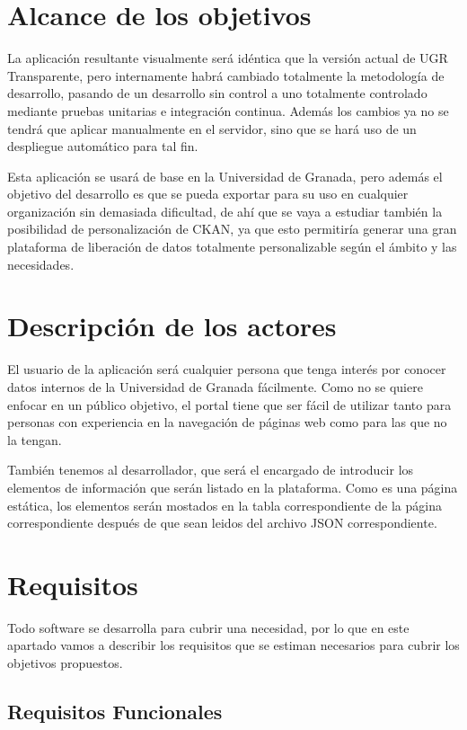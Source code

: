 \section{Alcance de los objetivos}

La aplicación resultante visualmente será idéntica que la versión actual de UGR Transparente, pero internamente habrá cambiado
totalmente la metodología de desarrollo, pasando de un desarrollo sin control a uno totalmente controlado mediante pruebas 
unitarias e integración continua. Además los cambios ya no se tendrá que aplicar manualmente en el servidor, sino que se hará
uso de un despliegue automático para tal fin.

\bigskip
Esta aplicación se usará de base en la Universidad de Granada, pero además el objetivo del desarrollo es que se pueda exportar 
para su uso en cualquier organización sin demasiada dificultad, de ahí que se vaya a estudiar también la posibilidad de 
personalización de CKAN, ya que esto permitiría generar una gran plataforma de liberación de datos totalmente personalizable
según el ámbito y las necesidades.

\section{Descripción de los actores}

El usuario de la aplicación será cualquier persona que tenga interés por conocer datos internos de la Universidad de Granada 
fácilmente. Como no se quiere enfocar en un público objetivo, el portal tiene que ser fácil de utilizar tanto para personas 
con experiencia en la navegación de páginas web como para las que no la tengan.

\bigskip
También tenemos al desarrollador, que será el encargado de introducir los elementos de información que serán listado en la
plataforma. Como es una página estática, los elementos serán mostados en la tabla correspondiente de la página correspondiente
después de que sean leidos del archivo JSON correspondiente.

\newpage
\section{Requisitos}

Todo software se desarrolla para cubrir una necesidad, por lo que en este apartado vamos a describir los requisitos que se 
estiman necesarios para cubrir los objetivos propuestos.

\subsection{Requisitos Funcionales}


